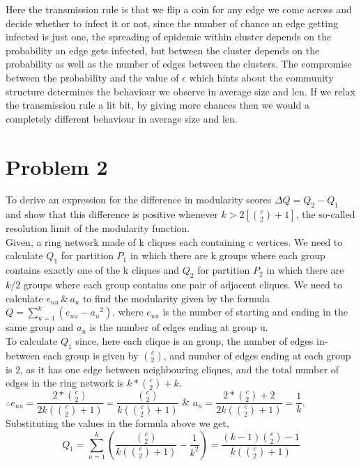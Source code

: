 \documentclass{article}
\begin{document}
\begin{enumerate}[label=(\alph*)]
Here the transmission rule is that we flip a coin for any edge we come across and decide whether to infect it or not, since the number of chance an edge getting infected is just one, the spreading of epidemic within cluster depends on the probability an edge gets infected, but between the cluster depends on the probability as well as the number of edges between the clusters. The compromise between the probability and the value of $\epsilon$ which hints about the community structure determines the behaviour we observe in average size and len. If we relax the transmission rule a lit bit, by giving more chances then we would a completely different behaviour in average size and len.
                  	
\section*{Problem 2}
To derive an expression for the difference in modularity scores $\Delta Q = Q_2-Q_1$ and show that this difference is positive whenever $k > 2 [{c\choose2} + 1]$, the so-called resolution limit of the modularity function.\\

Given, a ring network made of k cliques each containing c vertices. We need to calculate $Q_1$ for partition $P_1$ in which there are k groups where each group contains exactly one of the k cliques and $Q_2$ for partition $P_2$ in which there are $k/2$ groups where each group contains one pair of adjacent cliques. We need to calculate $e_{uu} \,\&\, a_u$ to find the modularity given by the formula $Q = \sum_{u=1}^{k} (e_{uu} - {a_u}^2)$, where $e_{uu}$ is the number of starting and ending in the same group and $a_u$ is the number of edges ending at group u.\\

To calculate $Q_1$ since, here each clique is an group,  the number of edges in-between each group is given by $c \choose 2$, and number of edges ending at each group is 2, as it has one edge between neighbouring cliques, and the total number of edges in the ring network is $k * {c \choose 2} + k$.\\

$\therefore e_{uu} = \dfrac{2 * {c \choose 2}}{2k({c \choose 2} +1)} = \dfrac{{c \choose 2}}{k({c \choose 2} +1)}$ \& $a_u = \dfrac{2 * {c \choose 2} + 2}{2k({c \choose 2} +1)} = \dfrac{1}{k}$, \\

Substituting the values in the formula above we get,
$$Q_1 = \sum_{u=1}^{k} (\dfrac{{c \choose 2}}{k({c \choose 2} +1)} -  \dfrac{1}{k^2}) = \dfrac{(k-1){c \choose 2} - 1}{k({c \choose 2} +1)}$$


\end{enumerate}
\end{document}
